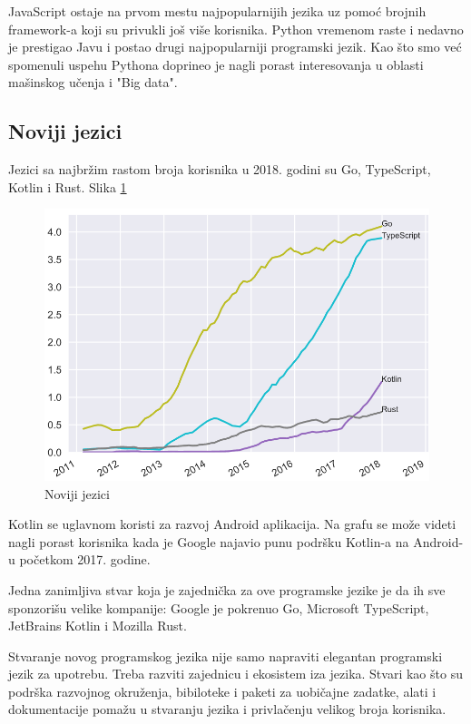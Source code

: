 \documentclass[a4paper]{article}
\begin{document}
JavaScript ostaje na prvom mestu najpopularnijih jezika uz pomoć brojnih framework-a koji su privukli još više korisnika.
Python vremenom raste i nedavno je prestigao Javu i postao drugi najpopularniji programski jezik. Kao što smo već spomenuli uspehu Pythona doprineo je nagli porast interesovanja u oblasti mašinskog učenja i "Big data".

\subsection{Noviji jezici}
\label{subsec:noviji jezici}

Jezici sa najbržim rastom broja korisnika u 2018. godini su Go, TypeScript, Kotlin i Rust. Slika \ref{fig:novijiJezici}

\begin{figure}[h!]
\begin{center}
\includegraphics[scale=0.4]{slike/novijiJezici.png}
\end{center}
\caption{Noviji jezici}
\label{fig:novijiJezici}
\end{figure}

Kotlin se uglavnom koristi za razvoj Android aplikacija. Na grafu se može videti nagli porast korisnika kada je Google najavio punu podršku Kotlin-a na Android-u početkom 2017. godine.

Jedna zanimljiva stvar koja je zajednička za ove programske jezike je da ih sve sponzorišu velike kompanije: Google je pokrenuo Go, Microsoft TypeScript, JetBrains Kotlin i Mozilla Rust.

Stvaranje novog programskog jezika nije samo napraviti elegantan programski jezik za upotrebu. Treba razviti zajednicu i ekosistem iza jezika. Stvari kao što su podrška razvojnog okruženja, bibiloteke i paketi za uobičajne zadatke, alati i dokumentacije pomažu u stvaranju jezika i privlačenju velikog broja korisnika.
\end{document}
